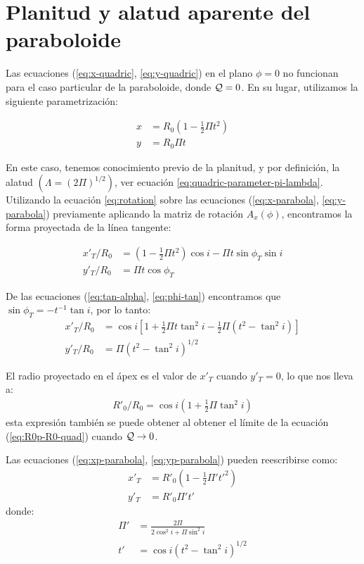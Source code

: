 \chapter[Paraboloide]{Planitud y alatud aparente del paraboloide}
\label{app:paraboloid}
Las ecuaciones (\ref{eq:x-quadric}, \ref{eq:y-quadric}) en el plano $\phi = 0$ no funcionan para el caso particular de la paraboloide, donde $\mathcal{Q}=0$. En su lugar, utilizamos la siguiente parametrización:

\begin{align}
  x &= R_0\left(1 - \frac{1}{2}\Pi t^2\right) \label{eq:x-parabola}\\
  y &= R_0 \Pi t \label{eq:y-parabola}
\end{align}

En este caso, tenemos conocimiento previo de la planitud, y por definición, la alatud $(\Lambda=\left(2\Pi\right)^{1/2})$, ver ecuación \ref{eq:quadric-parameter-pi-lambda}. Utilizando la ecuación \ref{eq:rotation} sobre las ecuaciones (\ref{eq:x-parabola}, \ref{eq:y-parabola}) previamente aplicando la matriz de rotación $A_x(\phi)$, encontramos la forma proyectada de la línea tangente:

\begin{align}
  x'_T /R_0 &= \left(1 - \frac{1}{2}\Pi t^2\right)\cos{i} - \Pi t\sin\phi_T\sin{i} \\
  y'_T/R_0 &= \Pi t\cos\phi_T
\end{align}

De las ecuaciones (\ref{eq:tan-alpha}, \ref{eq:phi-tan}) encontramos que $\sin\phi_T = -t^{-1}\tan{i}$, por lo tanto:
\begin{align}
    x'_T /R_0 &= \cos{i}\left[1 + \frac{1}{2}\Pi t \tan^2i - \frac{1}{2}\Pi\left(t^2 - \tan^2i\right)\right] \label{eq:xp-parabola}\\
  y'_T/R_0 &= \Pi\left(t^2 - \tan^2i\right)^{1/2}\label{eq:yp-parabola}
\end{align}

El radio proyectado en el ápex es el valor de $x'_T$ cuando $y'_T = 0$, lo que nos lleva a:
\begin{align}
  R'_0/R_0 = \cos{i}\left(1 + \frac{1}{2}\Pi\tan^2i\right)
\end{align}
esta expresión también se puede obtener al obtener el límite de la ecuación (\ref{eq:R0p-R0-quad}) cuando $\mathcal{Q}\to 0$.

Las ecuaciones (\ref{eq:xp-parabola}, \ref{eq:yp-parabola}) pueden reescribirse como:
\begin{align}
  x'_T &= R'_0\left(1 - \frac{1}{2}\Pi' t'^2\right) \\
  y'_T &= R'_0\Pi' t'
\end{align}
donde:
\begin{align}
  \Pi' &= \frac{2\Pi}{2\cos^2i + \Pi\sin^2i} \label{eq:proj-planitude-parabola}\\
  t' &= \cos{i}\left(t^2 - \tan^2i\right)^{1/2}
\end{align}

